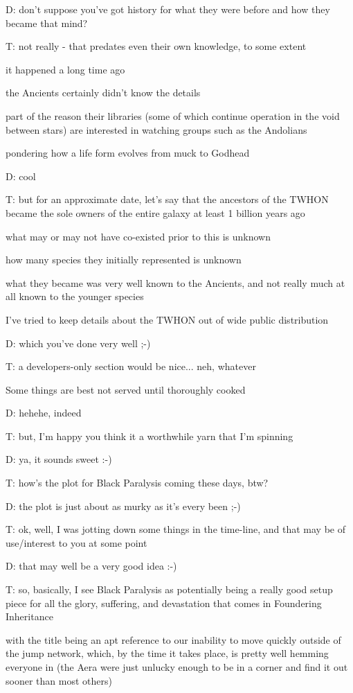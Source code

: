 D: don't suppose you've got history for what they were before and how they became that mind?

T: not really - that predates even their own knowledge, to some extent

it happened a long time ago

the Ancients certainly didn't know the details

part of the reason their libraries (some of which continue operation in the void between stars) are interested in watching groups such as the Andolians

pondering how a life form evolves from muck to Godhead

D: cool

T: but for an approximate date, let's say that the ancestors of the TWHON became the sole owners of the entire galaxy at least 1 billion years ago

what may or may not have co-existed prior to this is unknown

how many species they initially represented is unknown

what they became was very well known to the Ancients, and not really much at all known to the younger species

I've tried to keep details about the TWHON out of wide public distribution

D: which you've done very well ;-)

T: a developers-only section would be nice... neh, whatever

Some things are best not served until thoroughly cooked

D: hehehe, indeed

T: but, I'm happy you think it a worthwhile yarn that I'm spinning

D: ya, it sounds sweet :-)

T: how's the plot for Black Paralysis coming these days, btw?

D: the plot is just about as murky as it's every been ;-)

T: ok, well, I was jotting down some things in the time-line, and that may be of use/interest to you at some point

D: that may well be a very good idea :-)

T: so, basically, I see Black Paralysis as potentially being a really good setup piece for all the glory, suffering, and devastation that comes in Foundering Inheritance

with the title being an apt reference to our inability to move quickly outside of the jump network, which, by the time it takes place, is pretty well hemming everyone in (the Aera were just unlucky enough to be in a corner and find it out sooner than most others)

